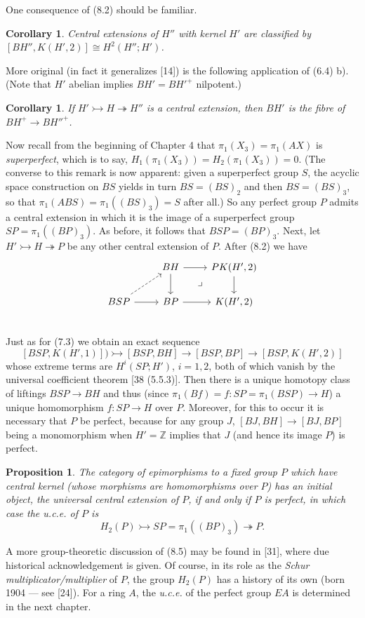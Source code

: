\documentclass[openany,leqno]{book}  %
\newcommand{\Z}{\mathbb{Z}}
\newtheorem{prop}[theorem]{Proposition}
\newtheorem{corollary}[theorem]{Corollary}
\begin{document}
One consequence of (8.2) should be familiar.
\begin{corollary}
  Central extensions of $H''$ with kernel $H'$ are classified by $[BH'', K(H',2)]\cong H^2(H''; H')$.
\end{corollary}
More original (in fact it generalizes [14]) is the following application of (6.4) b). (Note that $H'$ abelian implies $BH' = {BH'}^+$ nilpotent.)
\begin{corollary}
  If $H'\rightarrowtail H \twoheadrightarrow H''$ is a central extension, then $BH'$ is the fibre of $BH^+ \longrightarrow {BH''}^+$.
\end{corollary}
Now recall from the beginning of Chapter 4 that $\pi_1(X_3) = \pi_1 (AX)$ is {\em superperfect}, which is to say, $H_1 (\pi_1 (X_3)) = H_2(\pi_1 (X_3)) = 0$. (The converse to this remark is now apparent: given a superperfect group $S$, the acyclic space construction on $BS$ yields in turn $BS = (BS)_2$ and then $BS = (BS)_3$, so that $\pi_1 (ABS) = \pi_1((BS)_3) = S$ after all.) So any perfect group $P$ admits a central extension in which it is the image of a superperfect group $SP = \pi_1((BP)_3)$. As before, it follows that $BSP = (BP)_3$. Next, let $H'\rightarrowtail H \twoheadrightarrow P$ be any other central extension of $P$. After (8.2)
we have
\[
\begin{tikzcd}
  & BH \arrow[d] \arrow[r] \arrow[dr, phantom, "\lrcorner"] &PK(H',2) \arrow[d] \\
 BSP \arrow[ru,dashrightarrow] \arrow[r] &BP \arrow[r] & K(H',2)\\  
\end{tikzcd}
\]
Just as for (7.3) we obtain an exact sequence
\[[BSP, K(H',1)] )\rightarrowtail [BSP, BH] \longrightarrow [BSP, BP] \longrightarrow [BSP, K(H',2)]\]
whose extreme terms are $H^i(SP; H')$, $i = 1, 2$, both of which vanish by the universal coefficient theorem [38 (5.5.3)]. Then there is a unique homotopy class of liftings $BSP \longrightarrow BH$ and thus (since $\pi_1 (Bf) = f\colon  SP = \pi_1 (BSP) \longrightarrow H$) a unique homomorphism $f\colon   SP \longrightarrow H$ over $P$. Moreover, for this to occur it is necessary that $P$ be perfect, because for any group $J$, $[BJ, BH] \longrightarrow [BJ, BP]$ being a monomorphism when $H'=\Z$ implies that $J$ (and hence its image $P$) is perfect.
\begin{prop}
  The category of epimorphisms to a fixed group $P$ which have central kernel (whose morphisms are homomorphisms over $P$) has an initial object, the universal central extension of $P$, if and only if $P$ is perfect, in which case the u.c.e. of $P$ is
\[H_2(P) \rightarrowtail SP = \pi_1((BP)_3)\twoheadrightarrow P .\]
\end{prop}
A more group-theoretic discussion of (8.5) may be found in [31], where due historical
acknowledgement is given. Of course, in its role as the {\em Schur multiplicator/multiplier} of $P$, the group $H_2(P)$ has a history of its own (born 1904 --- see [24]). For a ring $A$, the {\em u.c.e.} of the perfect group $EA$ is determined in the next chapter.
\end{document}
